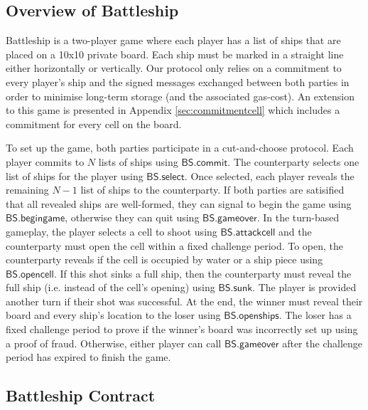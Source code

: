 \documentclass{llncs}
\newcommand{\battleshipattackcell}{\mathsf{BS.attackcell}}
\newcommand{\battleshipbegin}{\mathsf{BS.begingame}}
\newcommand{\battleshipcommit}{\mathsf{BS.commit}}
\newcommand{\battleshipselectboard}{\mathsf{BS.select}}
\newcommand{\battleshiprevealcell}{\mathsf{BS.opencell}}
\newcommand{\battleshipsinking}{\mathsf{BS.sunk}}
\newcommand{\battleshiprevealboard}{\mathsf{BS.openships}}
\newcommand{\battleshipgameover}{\mathsf{BS.gameover}}
\begin{document}
\subsection{Overview of Battleship}

Battleship is a two-player game where each player has a list of ships that are placed on a 10x10 private board. 
Each ship must be marked in a straight line either horizontally or vertically.
Our protocol only relies on a commitment to every player's ship and the signed messages exchanged between both parties in order to minimise long-term storage (and the associated gas-cost).
An extension to this game is presented in Appendix \ref{sec:commitmentcell} which includes a commitment for every cell on the board. 


To set up the game, both parties participate in a cut-and-choose protocol.
Each player commits to $N$ lists of ships using $\battleshipcommit$. 
The counterparty selects one list of ships for the player using $\battleshipselectboard$.
Once selected, each player reveals the remaining $N-1$ list of ships to the counterparty. 
If both parties are satisified that all revealed ships are well-formed, they can signal to begin the game using $\battleshipbegin$, otherwise they can quit using $\battleshipgameover$. 
In the turn-based gameplay, the player selects a cell to shoot using $\battleshipattackcell$ and the counterparty must open the cell  within a fixed challenge period. 
To open, the counterparty reveals if the cell is occupied by water or a ship piece using $\battleshiprevealcell$.
If this shot sinks a full ship, then the counterparty must reveal the full ship (i.e. instead of the cell's opening) using $\battleshipsinking$. 
The player is provided another turn if their shot was successful.
At the end, the winner must reveal their board and every ship's location to the loser using $\battleshiprevealboard$.
The loser has a fixed challenge period to prove if the winner's board was incorrectly set up using a proof of fraud. 
Otherwise, either player can call $\battleshipgameover$ after the challenge period has expired to finish the game. 

\subsection{Battleship Contract}\label{sec:battleshipcontract}
\end{document}
